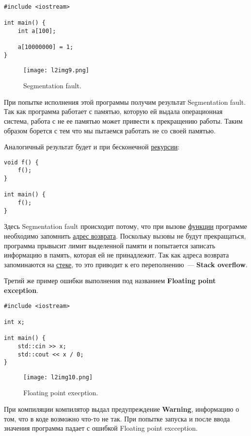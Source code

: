 \begin{verbatim}
#include <iostream>

int main() {
    int a[100];

    a[10000000] = 1;
}
\end{verbatim}

\begin{figure}[h]
    \centering
    \texttt{[image: l2img9.png]}
    \caption{Segmentation fault.}
    \label{l2img9}
\end{figure}

При попытке исполнения этой программы получим результат Segmentation fault.
Так как программа работает с памятью, которую ей выдала операционная система, работа с не ее памятью может привести к прекращению работы.
Таким образом борется с тем что мы пытаемся работать не со своей памятью.


Аналогичный результат будет и при бесконечной \underline{рекурсии}:
\begin{verbatim}
void f() {
    f();
}

int main() {
    f();
}
\end{verbatim}
Здесь Segmentation fault происходит потому, что при вызове \underline{функции} программе необходимо запомнить \underline{адрес возврата}.
Поскольку вызовы не будут прекращаться, программа прывысит лимит выделенной памяти и попытается записать информацию в память, которая ей не принадлежит.
Так как адреса возврата запоминаются на \underline{стеке}, то это приводит к его переполнению~--- \textbf{Stack overflow}.

Третий же пример ошибки выполнения под названием \textbf{Floating point exception}.

\begin{verbatim}
#include <iostream>

int x;

int main() {
    std::cin >> x;
    std::cout << x / 0;
}
\end{verbatim}

\begin{figure}[h]
    \centering
    \texttt{[image: l2img10.png]}
    \caption{Floating point execption.}
    \label{l2img10}
\end{figure}

При компиляции компилятор выдал предупреждение \textbf{Warning}, информацию о том, что в коде возможно что-то не так.
При попытке запуска и после ввода значения программа падает с ошибкой Floating point excception.

